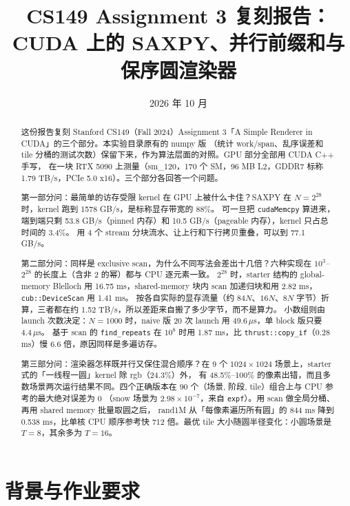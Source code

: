 \documentclass[11pt,a4paper]{ctexart}
\title{CS149 Assignment 3 复刻报告：\\CUDA 上的 SAXPY、并行前缀和与保序圆渲染器}
\author{\authorline}
\date{2026 年 10 月}
\begin{document}
\maketitle

\begin{abstract}
这份报告复刻 Stanford CS149（Fall 2024）Assignment 3「A Simple Renderer in CUDA」的三个部分。本实验目录原有的 numpy 版
（统计 work/span、乱序误差和 tile 分桶的测试次数）保留下来，作为算法层面的对照。GPU 部分全部用 CUDA C++ 手写，
在一块 RTX 5090 上测量（sm\_120，170 个 SM，96 MB L2，GDDR7 标称 1.79 TB/s，PCIe 5.0 x16）。三个部分各回答一个问题。

第一部分问：最简单的访存受限 kernel 在 GPU 上被什么卡住？SAXPY 在 $N=2^{28}$ 时，kernel 跑到 1578 GB/s，是标称显存带宽的 88\%。
可一旦把 \texttt{cudaMemcpy} 算进来，端到端只剩 53.8 GB/s（pinned 内存）和 10.5 GB/s（pageable 内存），kernel 只占总时间的 3.4\%。
用 4 个 stream 分块流水、让上行和下行拷贝重叠，可以到 77.1 GB/s。

第二部分问：同样是 exclusive scan，为什么不同写法会差出十几倍？六种实现在 $10^3$–$2^{28}$ 的长度上（含非 2 的幂）都与 CPU 逐元素一致。
$2^{28}$ 时，starter 结构的 global-memory Blelloch 用 16.75 ms，shared-memory 块内 scan 加递归块和用 2.82 ms，\texttt{cub::DeviceScan} 用 1.41 ms。
按各自实际的显存流量（约 $84N$、$16N$、$8N$ 字节）折算，三者都在约 1.52 TB/s，所以差距来自搬了多少字节，而不是算力。
小数组则由 launch 次数决定：$N=1000$ 时，naive 版 20 次 launch 用 49.6\,$\mu$s，单 block 版只要 4.4\,$\mu$s。
基于 scan 的 \texttt{find\_repeats} 在 $10^8$ 时用 1.87 ms，比 \texttt{thrust::copy\_if}（0.28 ms）慢 6.6 倍，原因同样是多遍访存。

第三部分问：渲染器怎样既并行又保住混合顺序？在 9 个 $1024\times1024$ 场景上，starter 式的「一线程一圆」kernel 除 rgb（24.3\%）外，
有 48.5\%–100\% 的像素出错，而且多数场景两次运行结果不同。四个正确版本在 90 个（场景, 阶段, tile）组合上与 CPU 参考的最大绝对误差为 0
（snow 场景为 $2.98\times10^{-7}$，来自 \texttt{expf}）。用 scan 做全局分桶、再用 shared memory 批量取圆之后，
rand1M 从「每像素遍历所有圆」的 844 ms 降到 0.538 ms，比单核 CPU 顺序参考快 712 倍。最优 tile 大小随圆半径变化：小圆场景是 $T=8$，其余多为 $T=16$。
\end{abstract}

\tableofcontents
\newpage

\section{背景与作业要求}
\end{document}
